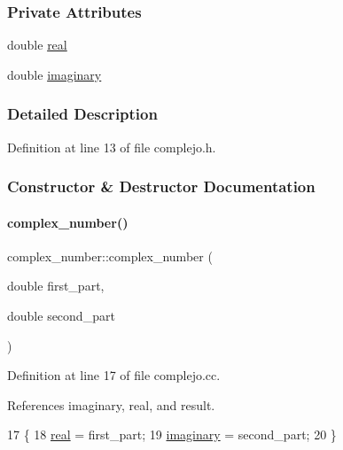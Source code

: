 \subsubsection*{Private Attributes}
\begin{DoxyCompactItemize}
\item 
double \hyperlink{classcomplex__number_a57a6f97bb6028f8f98c321514d2aa7a0}{real}
\item 
double \hyperlink{classcomplex__number_a809ebdf297fb9093cf4c6f1e2728be90}{imaginary}
\end{DoxyCompactItemize}


\subsubsection{Detailed Description}


Definition at line 13 of file complejo.\+h.



\subsubsection{Constructor \& Destructor Documentation}
\mbox{\label{classcomplex__number_a30f1afa4e0aaeaf347f667a503cf63f6}} 
\paragraph{\texorpdfstring{complex\+\_\+number()}{complex\_number()}}
{\footnotesize\ttfamily complex\+\_\+number\+::complex\+\_\+number (\begin{DoxyParamCaption}\item[{double}]{first\+\_\+part,  }\item[{double}]{second\+\_\+part }\end{DoxyParamCaption})}



Definition at line 17 of file complejo.\+cc.



References imaginary, real, and result.


\begin{DoxyCode}
17                                                                    \{
18   \hyperlink{classcomplex__number_a57a6f97bb6028f8f98c321514d2aa7a0}{real} = first\_part;
19   \hyperlink{classcomplex__number_a809ebdf297fb9093cf4c6f1e2728be90}{imaginary} = second\_part;
20 \}
\end{DoxyCode}


